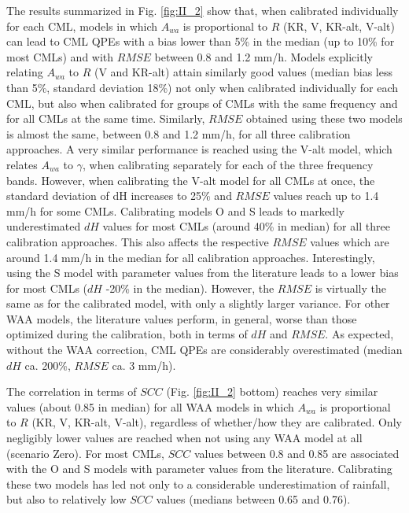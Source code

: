 \documentclass{ctuthesis}\usepackage[]{graphicx}\usepackage[]{color}
\begin{document}
The results summarized in Fig. \ref{fig:II_2} show that, when calibrated individually for each CML, models in which $A_{wa}$ is proportional to $R$ (KR, V, KR-alt, V-alt) can lead to CML QPEs with a bias lower than 5\% in the median (up to 10\% for most CMLs) and with $R\!M\!S\!E$ between 0.8 and 1.2 mm/h. Models explicitly relating $A_{wa}$ to $R$ (V and KR-alt) attain similarly good values (median bias less than 5\%, standard deviation 18\%) not only when calibrated individually for each CML, but also when calibrated for groups of CMLs with the same frequency and for all CMLs at the same time. Similarly, $R\!M\!S\!E$ obtained using these two models is almost the same, between 0.8 and 1.2 mm/h, for all three calibration approaches. A very similar performance is reached using the V-alt model, which relates $A_{wa}$ to $\gamma$, when calibrating separately for each of the three frequency bands. However, when calibrating the V-alt model for all CMLs at once, the standard deviation of dH increases to 25\% and $R\!M\!S\!E$ values reach up to 1.4 mm/h for some CMLs. Calibrating models O and S leads to markedly underestimated $d\!H$ values for most CMLs (around 40\% in median) for all three calibration approaches. This also affects the respective $R\!M\!S\!E$ values which are around 1.4 mm/h in the median for all calibration approaches. Interestingly, using the S model with parameter values from the literature leads to a lower bias for most CMLs ($d\!H$ -20\% in the median). However, the $R\!M\!S\!E$ is virtually the same as for the calibrated model, with only a slightly larger variance. For other WAA models, the literature values perform, in general, worse than those optimized during the calibration, both in terms of $d\!H$ and $R\!M\!S\!E$. As expected, without the WAA correction, CML QPEs are considerably overestimated (median $d\!H$ ca. 200\%, $R\!M\!S\!E$ ca. 3 mm/h). 



The correlation in terms of $S\!C\!C$ (Fig. \ref{fig:II_2} bottom) reaches very similar values (about 0.85 in median) for all WAA models in which $A_{wa}$ is proportional to $R$ (KR, V, KR-alt, V-alt), regardless of whether/how they are calibrated. Only negligibly lower values are reached when not using any WAA model at all (scenario Zero). For most CMLs, $S\!C\!C$ values between 0.8 and 0.85 are associated with the O and S models with parameter values from the literature. Calibrating these two models has led not only to a considerable underestimation of rainfall, but also to relatively low $S\!C\!C$ values (medians between 0.65 and 0.76). 
\end{document}
